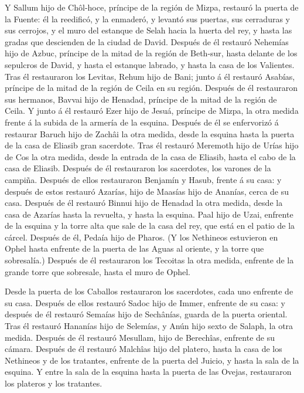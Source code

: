  Y Sallum hijo de Chôl-hoce, príncipe de la región de
Mizpa, restauró la puerta de la Fuente: él la reedificó, y la enmaderó,
y levantó sus puertas, sus cerraduras y sus cerrojos, y el muro del
estanque de Selah hacia la huerta del rey, y hasta las gradas que
descienden de la ciudad de David.  Después de él restauró
Nehemías hijo de Azbuc, príncipe de la mitad de la región de Beth-sur,
hasta delante de los sepulcros de David, y hasta el estanque labrado, y
hasta la casa de los Valientes.  Tras él restauraron los
Levitas, Rehum hijo de Bani; junto á él restauró Asabías, príncipe de la
mitad de la región de Ceila en su región.  Después de él
restauraron sus hermanos, Bavvai hijo de Henadad, príncipe de la mitad
de la región de Ceila.  Y junto á él restauró Ezer hijo de
Jesuá, príncipe de Mizpa, la otra medida frente á la subida de la
armería de la esquina.  Después de él se enfervorizó á
restaurar Baruch hijo de Zachâi la otra medida, desde la esquina hasta
la puerta de la casa de Eliasib gran sacerdote.  Tras él
restauró Meremoth hijo de Urías hijo de Cos la otra medida, desde la
entrada de la casa de Eliasib, hasta el cabo de la casa de Eliasib.
 Después de él restauraron los sacerdotes, los varones de
la campiña.  Después de ellos restauraron Benjamín y Hasub,
frente á su casa: y después de estos restauró Azarías, hijo de Maasías
hijo de Ananías, cerca de su casa.  Después de él restauró
Binnui hijo de Henadad la otra medida, desde la casa de Azarías hasta la
revuelta, y hasta la esquina.  Paal hijo de Uzai, enfrente
de la esquina y la torre alta que sale de la casa del rey, que está en
el patio de la cárcel. Después de él, Pedaía hijo de Pharos.
 (Y los Nethineos estuvieron en Ophel hasta enfrente de la
puerta de las Aguas al oriente, y la torre que sobresalía.)
 Después de él restauraron los Tecoitas la otra medida,
enfrente de la grande torre que sobresale, hasta el muro de Ophel.

 Desde la puerta de los Caballos restauraron los
sacerdotes, cada uno enfrente de su casa.  Después de ellos
restauró Sadoc hijo de Immer, enfrente de su casa: y después de él
restauró Semaías hijo de Sechânías, guarda de la puerta oriental.
 Tras él restauró Hananías hijo de Selemías, y Anún hijo
sexto de Salaph, la otra medida. Después de él restauró Mesullam, hijo
de Berechîas, enfrente de su cámara.  Después de él
restauró Malchîas hijo del platero, hasta la casa de los Nethineos y de
los tratantes, enfrente de la puerta del Juicio, y hasta la sala de la
esquina.  Y entre la sala de la esquina hasta la puerta de
las Ovejas, restauraron los plateros y los tratantes.

